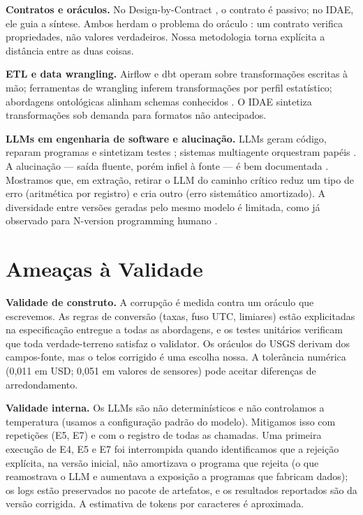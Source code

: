 \documentclass[sigconf,nonacm]{acmart}
\begin{document}
\textbf{Contratos e oráculos.} No Design-by-Contract \cite{meyer1997object}, o contrato é passivo; no IDAE, ele guia a síntese. Ambos herdam o problema do oráculo \cite{barr2015oracle}: um contrato verifica propriedades, não valores verdadeiros. Nossa metodologia torna explícita a distância entre as duas coisas.

\textbf{ETL e data wrangling.} Airflow \cite{airflow2023} e dbt \cite{dbt2024} operam sobre transformações escritas à mão; ferramentas de wrangling \cite{kandel2011wrangler} inferem transformações por perfil estatístico; abordagens ontológicas alinham schemas conhecidos \cite{santosjunior2023federated}. O IDAE sintetiza transformações sob demanda para formatos não antecipados.

\textbf{LLMs em engenharia de software e alucinação.} LLMs geram código, reparam programas e sintetizam testes \cite{chen2021evaluating,prenner2022automatic,schafer2023empirical}; sistemas multiagente orquestram papéis \cite{qian2024communicative,hong2024metagpt}. A alucinação --- saída fluente, porém infiel à fonte --- é bem documentada \cite{ji2023survey}. Mostramos que, em extração, retirar o LLM do caminho crítico reduz um tipo de erro (aritmética por registro) e cria outro (erro sistemático amortizado). A diversidade entre versões geradas pelo mesmo modelo é limitada, como já observado para N-version programming humano \cite{knight1986experimental}.

\section{Ameaças à Validade}

\textbf{Validade de construto.} A corrupção é medida contra um oráculo que escrevemos. As regras de conversão (taxas, fuso UTC, limiares) estão explicitadas na especificação entregue a todas as abordagens, e os testes unitários verificam que toda verdade-terreno satisfaz o validator. Os oráculos do USGS derivam dos campos-fonte, mas o telos corrigido é uma escolha nossa. A tolerância numérica (0,011 em USD; 0,051 em valores de sensores) pode aceitar diferenças de arredondamento.

\textbf{Validade interna.} Os LLMs são não determinísticos e não controlamos a temperatura (usamos a configuração padrão do modelo). Mitigamos isso com repetições (E5, E7) e com o registro de todas as chamadas. Uma primeira execução de E4, E5 e E7 foi interrompida quando identificamos que a rejeição explícita, na versão inicial, não amortizava o programa que rejeita (o que reamostrava o LLM e aumentava a exposição a programas que fabricam dados); os logs estão preservados no pacote de artefatos, e os resultados reportados são da versão corrigida. A estimativa de tokens por caracteres é aproximada.
\end{document}
